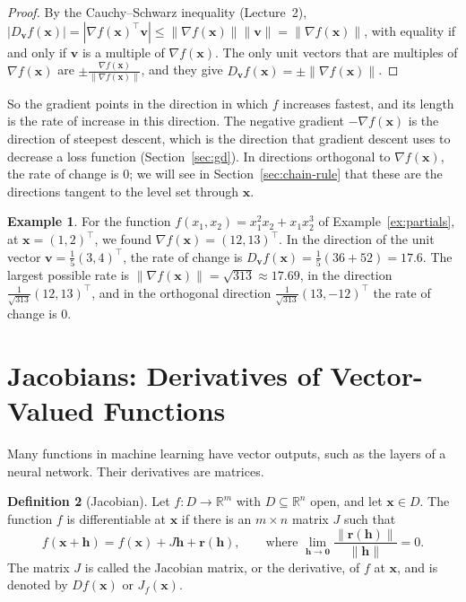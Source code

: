 \documentclass[11pt]{article}
\newcommand{\norm}[1]{\lVert #1 \rVert}
\theoremstyle{definition}
\newtheorem{definition}{Definition}[section]
\newtheorem{example}[definition]{Example}
\theoremstyle{plain}
\theoremstyle{remark}
\begin{document}
\begin{proof}
    By the Cauchy--Schwarz inequality (Lecture~2), $|D_{\mathbf{v}} f(\mathbf{x})| = |\nabla f(\mathbf{x})^\top \mathbf{v}| \leq \norm{\nabla f(\mathbf{x})} \norm{\mathbf{v}} = \norm{\nabla f(\mathbf{x})}$, with equality if and only if $\mathbf{v}$ is a multiple of $\nabla f(\mathbf{x})$. The only unit vectors that are multiples of $\nabla f(\mathbf{x})$ are $\pm \frac{\nabla f(\mathbf{x})}{\norm{\nabla f(\mathbf{x})}}$, and they give $D_{\mathbf{v}} f(\mathbf{x}) = \pm \norm{\nabla f(\mathbf{x})}$.
\end{proof}

So the gradient points in the direction in which $f$ increases fastest, and its length is the rate of increase in this direction. The negative gradient $-\nabla f(\mathbf{x})$ is the direction of steepest descent, which is the direction that gradient descent uses to decrease a loss function (Section~\ref{sec:gd}). In directions orthogonal to $\nabla f(\mathbf{x})$, the rate of change is $0$; we will see in Section~\ref{sec:chain-rule} that these are the directions tangent to the level set through $\mathbf{x}$.

\begin{example}\label{ex:directional}
    For the function $f(x_1, x_2) = x_1^2 x_2 + x_1 x_2^3$ of Example~\ref{ex:partials}, at $\mathbf{x} = (1, 2)^\top$, we found $\nabla f(\mathbf{x}) = (12, 13)^\top$. In the direction of the unit vector $\mathbf{v} = \frac{1}{5}(3, 4)^\top$, the rate of change is $D_{\mathbf{v}} f(\mathbf{x}) = \frac{1}{5}(36 + 52) = 17.6$. The largest possible rate is $\norm{\nabla f(\mathbf{x})} = \sqrt{313} \approx 17.69$, in the direction $\frac{1}{\sqrt{313}}(12, 13)^\top$, and in the orthogonal direction $\frac{1}{\sqrt{313}}(13, -12)^\top$ the rate of change is $0$.
\end{example}

\section{Jacobians: Derivatives of Vector-Valued Functions}\label{sec:jacobians}

Many functions in machine learning have vector outputs, such as the layers of a neural network. Their derivatives are matrices.

\begin{definition}[Jacobian]\label{def:jacobian}
    Let $f: D \to \mathbb{R}^m$ with $D \subseteq \mathbb{R}^n$ open, and let $\mathbf{x} \in D$. The function $f$ is differentiable at $\mathbf{x}$ if there is an $m \times n$ matrix $J$ such that
    \[f(\mathbf{x} + \mathbf{h}) = f(\mathbf{x}) + J\mathbf{h} + \mathbf{r}(\mathbf{h}), \qquad \text{where } \lim_{\mathbf{h} \to \mathbf{0}} \frac{\norm{\mathbf{r}(\mathbf{h})}}{\norm{\mathbf{h}}} = 0.\]
    The matrix $J$ is called the Jacobian matrix, or the derivative, of $f$ at $\mathbf{x}$, and is denoted by $Df(\mathbf{x})$ or $J_f(\mathbf{x})$.
\end{definition}
\end{document}
